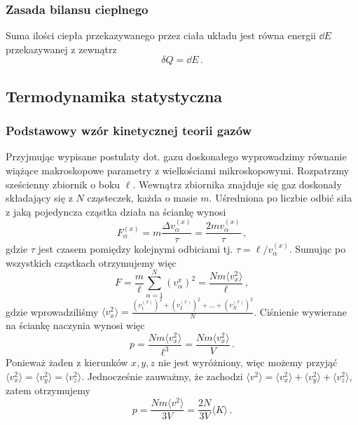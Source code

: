 \documentclass[../main.tex]{subfiles}
\begin{document}
\subsubsection{Zasada bilansu cieplnego}
Suma ilości ciepła przekazywanego przez ciała układu jest równa energii \(\dd{E}\) przekazywanej z zewnątrz
\begin{equation*}
    \delta Q= \dd{E}\,.
\end{equation*}

\subsection{Termodynamika statystyczna}
\subsubsection{Podstawowy wzór kinetycznej teorii gazów}
Przyjmując wypisane postulaty dot. gazu doskonałego wyprowadzimy równanie wiążące makroskopowe parametry z wielkościami mikroskopowymi. Rozpatrzmy sześcienny zbiornik o boku \(\ell\). Wewnątrz zbiornika znajduje się gaz doskonały składający się z \(N\) cząsteczek, każda o masie \(m\). Uśredniona po liczbie odbić siła z jaką pojedyncza cząstka działa na ściankę wynosi
\begin{equation*}
    F_\alpha^{(x)}=m\frac{\Delta v_\alpha^{(x)}}{\tau}=\frac{2mv_\alpha^{(x)}}{\tau}\,,
\end{equation*}
gdzie \(\tau\) jest czasem pomiędzy kolejnymi odbiciami tj. \(\tau=\ell/v_\alpha^{(x)}\). Sumując po wszystkich cząstkach otrzymujemy więc
\begin{equation*}
    F=\frac{m}{\ell}\sum_{\alpha=1}^{N}(v_\alpha^{x})^2=\frac{Nm\langle v_x^2\rangle}{\ell}\,,
\end{equation*}
gdzie wprowadziliśmy \(\langle v_x^2\rangle =\frac{(v_1^{(x)})^2+(v_2^{(x)})^2+...+(v_N^{(x)})^2}{N}\). Ciśnienie wywierane na ściankę naczynia wynosi więc
\begin{equation*}
    p=\frac{Nm\langle v_x^2\rangle }{\ell ^3}=\frac{Nm\langle v_x^2\rangle }{V}\,.
\end{equation*}
Ponieważ żaden z kierunków \(x,y,z\) nie jest wyróżniony, więc możemy przyjąć \(\langle v_x^2\rangle=\langle v_y^2\rangle=\langle v_z^2\rangle\). Jednocześnie zauważmy, że zachodzi \(\langle v^2\rangle=\langle v_x^2\rangle+\langle v_y^2\rangle+\langle v_z^2\rangle\), zatem otrzymujemy
\begin{equation*}
    p=\frac{Nm\langle v^2\rangle}{3V}=\frac{2N}{3V}\langle K\rangle\,.
\end{equation*}
\end{document}
